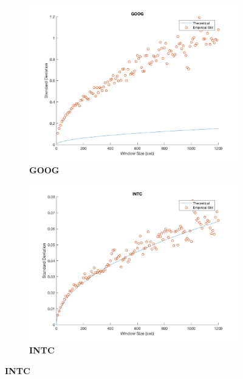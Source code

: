 \begin{figure}[htbp]
\vspace{3mm}

\begin{subfigure}[t]{0.49\textwidth}
\captionsetup{labelformat=empty}

\caption{\textbf{GOOG}}
\includegraphics[width=\textwidth, trim = 0 0 0 30, clip]{CHPDO_Fit/GOOG_Plot_CHPDO_21600.png}

\end{subfigure}
\begin{subfigure}[t]{0.49\textwidth}
\captionsetup{labelformat=empty}

\caption{\textbf{INTC}}
\includegraphics[width=\textwidth, trim = 0 0 0 30, clip]{CHPDO_Fit/INTC_Plot_CHPDO_21600.png}
\end{subfigure}


\end{figure}
